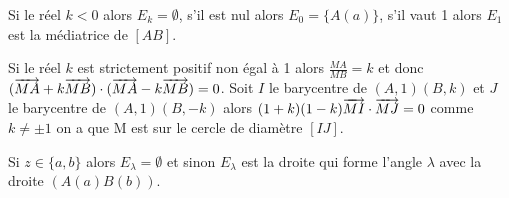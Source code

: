 Si le réel $k<0$ alors $E_k=\emptyset$, s'il est nul alors $E_0=\{A(a)\}$, s'il vaut 1 alors $E_1$ est la médiatrice de $[AB]$.

Si le réel $k$ est strictement positif non égal à 1 alors $\frac{MA}{MB}=k$ et donc $(\overrightarrow{MA}+k\overrightarrow{MB}) \cdot (\overrightarrow{MA}-k\overrightarrow{MB})=0$. Soit $I$ le barycentre de $(A,1)(B,k)$ et $J$ le barycentre de $(A,1)(B,-k)$ alors $(1+k)(1-k) \overrightarrow{MI} \cdot \overrightarrow{MJ} =0$ comme $k \neq \pm 1$ on a que M est sur le cercle de diamètre $[IJ]$.

Si $z \in \{a,b\}$ alors $E_\lambda=\emptyset$ et sinon $E_\lambda$ est la droite qui forme l'angle $\lambda$ avec la droite $(A(a)B(b))$.
